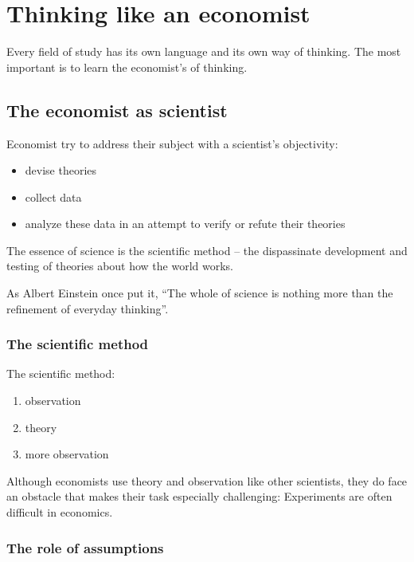 
\chapter{Thinking like an economist}

Every field of study has its own language and its own way of thinking.
The most important is to learn the economist's of thinking.


\section{The economist as scientist}

Economist try to address their subject with a scientist's objectivity:
\begin{itemize}
\item devise theories
\item collect data
\item analyze these data in an attempt to verify or refute their theories
\end{itemize}

\begin{tcolorbox}
  The essence of science is the scientific method -- the dispassinate development and testing of theories about how the world works.
\end{tcolorbox}

As Albert Einstein once put it, ``The whole of science is nothing more than the refinement of everyday thinking''.


\subsection{The scientific method}

The scientific method:
\begin{enumerate}
\item observation
\item theory
\item more observation
\end{enumerate}

Although economists use theory and observation like other scientists, they do face an obstacle that makes their task especially challenging: Experiments are often difficult in economics.

\subsection{The role of assumptions}

